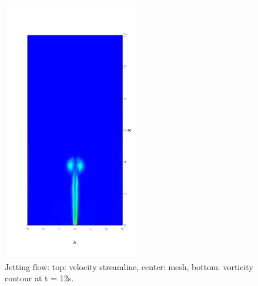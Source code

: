 \documentclass[a4paper, 11pt]{article}
\begin{document}
\begin{figure}[!htbp]
\begin{center}
             \includegraphics[width = 0.53\textwidth, angle = -90]{picture/jet_flow_data/contour_t12s.eps}
        \end{center}
        \caption{\small Jetting flow: top: velocity streamline,
          center: mesh,  bottom: vorticity contour at t = 12s.}

        \label{fig::jetting_flow_mesh}
       \end{figure}
       
       
        
        
\end{document}
